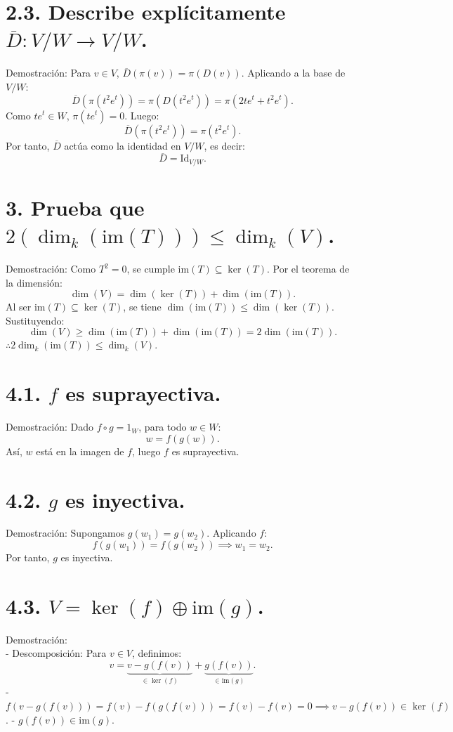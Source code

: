 \documentclass{article}
\begin{document}
\section{2.3. Describe explícitamente \(\overline{D}: V/W \to V/W\).  }
Demostración:  
Para \(v \in V\), \(\overline{D}(\pi(v)) = \pi(D(v))\). Aplicando a la base de \(V/W\):  
\[
\overline{D}(\pi(t^2e^t)) = \pi(D(t^2e^t)) = \pi(2te^t + t^2e^t).
\]  
Como \(te^t \in W\), \(\pi(te^t) = 0\). Luego:  
\[
\overline{D}(\pi(t^2e^t)) = \pi(t^2e^t).
\]  
Por tanto, \(\overline{D}\) actúa como la identidad en \(V/W\), es decir:  
\[
\overline{D} = \text{Id}_{V/W}.
\]

\section{3. Prueba que \(2(\dim_k(\text{im}(T))) \leq \dim_k(V)\).}
Demostración:  
Como \(T^2 = 0\), se cumple \(\text{im}(T) \subseteq \ker(T)\). Por el teorema de la dimensión:  
\[
\dim(V) = \dim(\ker(T)) + \dim(\text{im}(T)).
\]  
Al ser \(\text{im}(T) \subseteq \ker(T)\), se tiene \(\dim(\text{im}(T)) \leq \dim(\ker(T))\). Sustituyendo:  
\[
\dim(V) \geq \dim(\text{im}(T)) + \dim(\text{im}(T)) = 2\dim(\text{im}(T)).
\]  
\(\therefore 2\dim_k(\text{im}(T)) \leq \dim_k(V)\).

\section{4.1. \(f\) es suprayectiva.}  
Demostración:  
Dado \(f \circ g = 1_W\), para todo \(w \in W\):  
\[
w = f(g(w)).
\]  
Así, \(w\) está en la imagen de \(f\), luego \(f\) es suprayectiva.  

\section{4.2. \(g\) es inyectiva.}  
Demostración:  
Supongamos \(g(w_1) = g(w_2)\). Aplicando \(f\):  
\[
f(g(w_1)) = f(g(w_2)) \implies w_1 = w_2.
\]  
Por tanto, \(g\) es inyectiva.  

\section{4.3. \(V = \ker(f) \oplus \text{im}(g)\).  }
Demostración:  \\
- Descomposición: Para \(v \in V\), definimos:  
  \[
  v = \underbrace{v - g(f(v))}_{\in \ker(f)} + \underbrace{g(f(v))}_{\in \text{im}(g)}.
  \]  
  - \(f(v - g(f(v))) = f(v) - f(g(f(v))) = f(v) - f(v) = 0 \implies v - g(f(v)) \in \ker(f)\).  
  - \(g(f(v)) \in \text{im}(g)\).  
\end{document}
